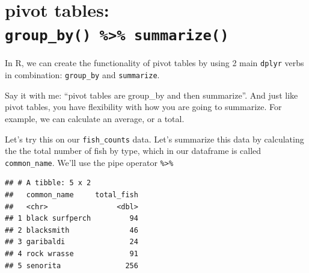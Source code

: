 \documentclass[]{book}
\newenvironment{Shaded}{\begin{snugshade}}{\end{snugshade}}
\newcommand{\CommentTok}[1]{\textcolor[rgb]{0.56,0.35,0.01}{\textit{#1}}}
\newcommand{\DataTypeTok}[1]{\textcolor[rgb]{0.13,0.29,0.53}{#1}}
\newcommand{\KeywordTok}[1]{\textcolor[rgb]{0.13,0.29,0.53}{\textbf{#1}}}
\newcommand{\NormalTok}[1]{#1}
\newcommand{\OperatorTok}[1]{\textcolor[rgb]{0.81,0.36,0.00}{\textbf{#1}}}
\newcommand{\StringTok}[1]{\textcolor[rgb]{0.31,0.60,0.02}{#1}}
\begin{document}
\begin{Shaded}
\end{Shaded}

\hypertarget{pivot-tables-group_by-summarize}{%
\section{\texorpdfstring{pivot tables: \texttt{group\_by()\ \%\textgreater{}\%\ summarize()}}{pivot tables: group\_by() \%\textgreater{}\% summarize()}}\label{pivot-tables-group_by-summarize}}

In R, we can create the functionality of pivot tables by using 2 main \texttt{dplyr} verbs in combination: \texttt{group\_by} and \texttt{summarize}.

Say it with me: ``pivot tables are group\_by and then summarize''. And just like pivot tables, you have flexibility with how you are going to summarize. For example, we can calculate an average, or a total.

Let's try this on our \texttt{fish\_counts} data. Let's summarize this data by calculating the the total number of fish by type, which in our dataframe is called \texttt{common\_name}. We'll use the pipe operator \texttt{\%\textgreater{}\%}

\begin{Shaded}
\end{Shaded}

\begin{verbatim}
## # A tibble: 5 x 2
##   common_name     total_fish
##   <chr>                <dbl>
## 1 black surfperch         94
## 2 blacksmith              46
## 3 garibaldi               24
## 4 rock wrasse             91
## 5 senorita               256
\end{verbatim}
\end{document}

